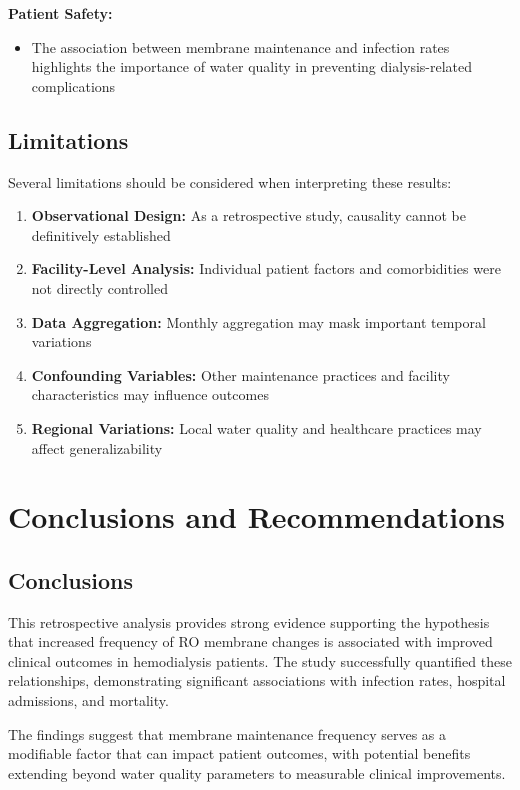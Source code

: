 \documentclass[11pt,a4paper]{article}
\begin{document}
\textbf{Patient Safety:}
\begin{itemize}
    \item The association between membrane maintenance and infection rates highlights the importance of water quality in preventing dialysis-related complications
\end{itemize}

\subsection{Limitations}

Several limitations should be considered when interpreting these results:

\begin{enumerate}
    \item \textbf{Observational Design:} As a retrospective study, causality cannot be definitively established
    \item \textbf{Facility-Level Analysis:} Individual patient factors and comorbidities were not directly controlled
    \item \textbf{Data Aggregation:} Monthly aggregation may mask important temporal variations
    \item \textbf{Confounding Variables:} Other maintenance practices and facility characteristics may influence outcomes
    \item \textbf{Regional Variations:} Local water quality and healthcare practices may affect generalizability
\end{enumerate}

\section{Conclusions and Recommendations}

\subsection{Conclusions}

This retrospective analysis provides strong evidence supporting the hypothesis that increased frequency of RO membrane changes is associated with improved clinical outcomes in hemodialysis patients. The study successfully quantified these relationships, demonstrating significant associations with infection rates, hospital admissions, and mortality.

The findings suggest that membrane maintenance frequency serves as a modifiable factor that can impact patient outcomes, with potential benefits extending beyond water quality parameters to measurable clinical improvements.
\end{document}
